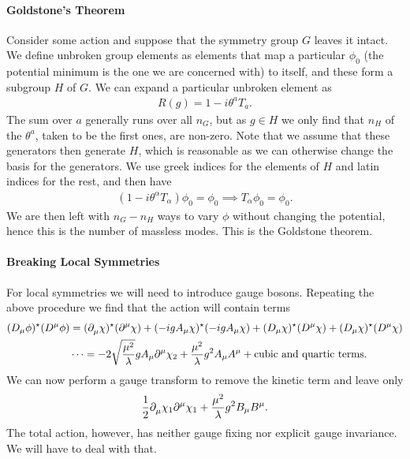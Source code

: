 \paragraph{Goldstone's Theorem}
Consider some action and suppose that the symmetry group $G$ leaves it intact. We define unbroken group elements as elements that map a particular $\phi_{0}$ (the potential minimum is the one we are concerned with) to itself, and these form a subgroup $H$ of $G$. We can expand a particular unbroken element as
\begin{align*}
	R(g) = 1 - i\theta^{a}T_{a}.
\end{align*}
The sum over $a$ generally runs over all $n_{G}$, but as $g\in H$ we only find that $n_{H}$ of the $\theta^{a}$, taken to be the first ones, are non-zero. Note that we assume that these generators then generate $H$, which is reasonable as we can otherwise change the basis for the generators. We use greek indices for the elements of $H$ and latin indices for the rest, and then have
\begin{align*}
	(1 - i\theta^{\alpha}T_{\alpha})\phi_{0} = \phi_{0}\implies T_{\alpha}\phi_{0} = \phi_{0}.
\end{align*}
We are then left with $n_{G} - n_{H}$ ways to vary $\phi$ without changing the potential, hence this is the number of massless modes. This is the Goldstone theorem.

\paragraph{Breaking Local Symmetries}
For local symmetries we will need to introduce gauge bosons. Repeating the above procedure we find that the action will contain terms
\begin{align*}
	(D_{\mu}\phi)^{\star}(D^{\mu}\phi) &= (\partial^{}_{\mu}\chi)^{\star}(\partial^{\mu}_{}\chi) + (-igA_{\mu}\chi)^{\star}(-igA_{\mu}\chi) + (D_{\mu}\chi)^{\star}(D^{\mu}\chi) + (D_{\mu}\chi)^{\star}(D^{\mu}\chi) \\
	                              &\dots = -2\sqrt{\frac{\mu^{2}}{\lambda}}gA_{\mu}\partial^{\mu}_{}\chi_{2} + \frac{\mu^{2}}{\lambda}g^{2}A_{\mu}A^{\mu} + \text{cubic and quartic terms}.
\end{align*}
We can now perform a gauge transform to remove the kinetic term and leave only
\begin{align*}
	\frac{1}{2}\partial^{}_{\mu}\chi_{1}\partial^{\mu}_{}\chi_{1} + \frac{\mu^{2}}{\lambda}g^{2}B_{\mu}B^{\mu}.
\end{align*}
The total action, however, has neither gauge fixing nor explicit gauge invariance. We will have to deal with that.

